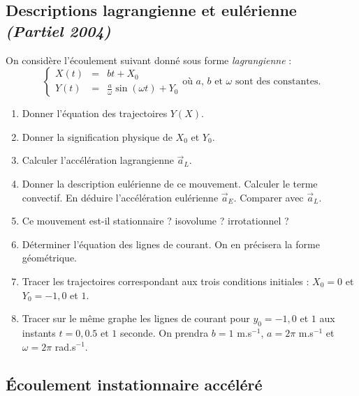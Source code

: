 \subsection{Descriptions lagrangienne et eul\'erienne 
{\small \it (Partiel 2004)}}


On consid\`ere l'\'ecoulement suivant donn\'e sous forme 
\textit{lagrangienne} :
\begin{equation*}
\left\{
\begin{array}{rcl}
X(t) & = & b t + X_0 \\
Y(t) & = & \frac{a}{\omega} \sin(\omega t) + Y_0
\end{array}
\right.
\text{o\`u $a$, $b$ et $\omega$ sont des constantes.}
\end{equation*}
\begin{enumerate}
\item Donner l'\'equation des trajectoires $Y(X)$.
\item Donner la signification physique de $X_0$ et $Y_0$.
\item Calculer l'acc\'el\'eration lagrangienne $\vec{a}_L$.
\item Donner la description eul\'erienne de ce mouvement.
Calculer le terme convectif. En d\'eduire l'acc\'el\'eration
eul\'erienne $\vec{a}_E$. Comparer avec $\vec{a}_L$.
\item Ce mouvement est-il stationnaire ? isovolume ? irrotationnel ?
\item D\'eterminer l'\'equation des lignes de courant. On en pr\'ecisera
la forme g\'eom\'etrique.
\item Tracer les trajectoires correspondant aux trois conditions initiales :
$X_0 = 0$ et $Y_0 = -1, 0$ et $1$.
\item Tracer sur le m\^eme graphe les lignes de courant pour $y_0 = -1, 0$
et $1$ aux instants $t = 0, 0.5$ et $1$ seconde. On prendra 
$b = 1$ m.s$^{-1}$, $a = 2 \pi$ m.s$^{-1}$ et $\omega = 2 \pi$ rad.s$^{-1}$.
\end{enumerate}



\subsection{\'Ecoulement instationnaire accéléré}


